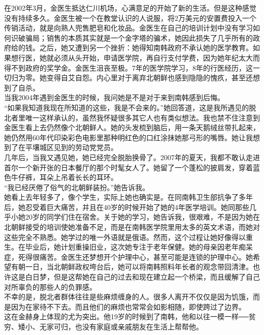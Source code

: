 在2002年3月，金医生抵达仁川机场，心满意足的开始了新的生活。但是这种感觉没有持续多久。金医生被一个在教堂认识的人说服，将2万美元的安置费投入一个传销活动，就是向熟人兜售肥皂和化妆品。金医生在自己的培训计划中没有学习如何识破骗局；销售的本质其实就是一个金字塔的骗术，她因此损失了几乎所有的政府给的钱。之后，她又遭到另一个挫折：她得知南韩政府不承认她的医学教育。如果想行医，她就必须从头开始，申请医学院，再自行支付学费，因为她年纪太大而得不到政府的奖学金。金医生沮丧至极。7年的医学院学习，8年的行医经历，这一切归为零。她变得自艾自怨。内心里对于离弃北朝鲜也感到隐隐的愧疚，甚至还想到了自杀。\\

当我2004年遇到金医生的时候，我问她是不是对于来到南韩感到后悔。\\

“如果我知道我现在所知道的这些，我是不会来的。”她回答道，这是我所遇见的脱北者里唯一这样承认的，虽然我怀疑很多其它人也有类似想法。我也禁不住注意到金医生看上去仍然像个北朝鲜人。她的头发梳到脑后，用一条天鹅绒丝带扎起来，她仍然用60年代印染彩色电影里那种明红色的口红涂抹她那弓形的嘴唇。她让我想到了在平壤城区见到的劳动党党员。\\

几年后，当我又遇见她，她已经完全脱胎换骨了。2007年的夏天，我都不敢认走进首尔一个新开张的日本餐厅的那个时髦女人了。她留了一个蓬松的披肩发，穿着蓝色牛仔裤，耳朵上吊着长长的耳环。\\

“我已经厌倦了俗气的北朝鲜装扮。”她告诉我。\\

她看上去年轻多了，像个学生，实际上她也确实是。在同南韩卫生部抗争了多年后，她忍受着巨大痛苦，并且在40岁的时候开始了她的4年医学培训。她同那些几乎小她20岁的同学们住在宿舍。关于她的学习，她告诉我，很艰难，不是因为她在北朝鲜接受的培训使她准备不足，而是在南韩医学院里用太多的英文术语，而她对这些完全不熟悉。她学过的唯一外语就是俄语。然而，这个过程让她好像得以重生。在毕业后，她计划重操旧业，这次她专注于老年保健。她的母亲因老年痴呆症，死得很痛苦。金医生还梦想开个护理中心，甚至可能是连锁的护理中心。她希望有朝一日，当北朝鲜政权垮台后，她可以将南韩照料年长者的观念带回清津。也许这是白日梦，但是这帮她在自己的过去和现在建立起一个桥梁，而且缓解了自己对所辜负的那些人的负罪感。\\

不幸的是，脱北者群体往往是些麻烦缠身的人。很多人离开不仅仅是因为饥饿，而是因为在家待不下去。而且他们的麻烦也常常会如影相随，即使跨过了边界。\\

这在金赫身上体现的尤为突出。他19岁的时候到了南韩，他和以往一模一样──贫穷、矮小、无家可归，也没有家庭或亲戚朋友在生活上帮帮他。\\

